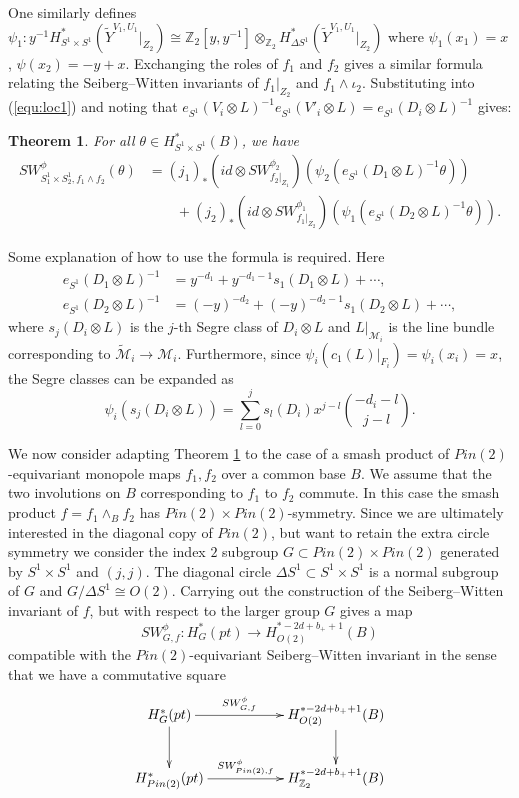 \documentclass{amsart}
\newtheorem{theorem}{Theorem}[section]
\theoremstyle{definition}
\theoremstyle{remark}
\numberwithin{equation}{section}
\begin{document}
One similarly defines $\psi_1 : y^{-1} H^*_{S^1 \times S^1}( \widetilde{Y}^{V_1,U_1}|_{Z_2}) \cong \mathbb{Z}_2[y,y^{-1}] \otimes_{\mathbb{Z}_2} H^*_{\Delta S^1}(\widetilde{Y}^{V_1,U_1}|_{Z_2})$ where $\psi_1(x_1) = x$, $\psi(x_2) = -y+x$. Exchanging the roles of $f_1$ and $f_2$ gives a similar formula relating the Seiberg--Witten invariants of $f_1|_{Z_2}$ and $f_1 \wedge \iota_2$. Substituting into (\ref{equ:loc1}) and noting that $e_{S^1}(V_i \otimes L)^{-1} e_{S^1}(V'_i \otimes L) = e_{S^1}(D_i \otimes L)^{-1}$ gives:
\begin{theorem}\label{thm:product1}
For all $\theta \in H^*_{S^1 \times S^1}(B)$, we have
\begin{align*}
SW^{\phi}_{S^1_1 \times S^1_2 , f_1 \wedge f_2}(\theta) &= (j_1)_*\left( id \otimes SW^{\phi_2}_{f_2|_{Z_1}}\right)( \psi_2(e_{S^1}(D_1 \otimes L)^{-1} \theta) ) \\
& \quad \quad + (j_2)_* \left(id \otimes SW^{\phi_1}_{f_1|_{Z_2}}\right)( \psi_1( e_{S^1}(D_2 \otimes L)^{-1} \theta) ).
\end{align*}
\end{theorem}
Some explanation of how to use the formula is required. Here 
\begin{align*}
e_{S^1}(D_1 \otimes L)^{-1} &= y^{-d_1} + y^{-d_1-1}s_1(D_1 \otimes L) + \cdots, \\
e_{S^1}(D_2 \otimes L)^{-1} &= (-y)^{-d_2} + (-y)^{-d_2-1}s_1(D_2 \otimes L) + \cdots,
\end{align*}
where $s_j( D_i \otimes L)$ is the $j$-th Segre class of $D_i \otimes L$ and $L|_{\mathcal{M}_i}$ is the line bundle corresponding to $\widetilde{\mathcal{M}}_i \to \mathcal{M}_i$. Furthermore, since $\psi_i( c_1(L)|_{F_i} ) = \psi_i(x_i) = x$, the Segre classes can be expanded as
\[
\psi_i ( s_j( D_i \otimes L) ) = \sum_{l = 0}^{j} s_l(D_i) x^{j-l} \binom{-d_i-l}{j-l}.
\]

We now consider adapting Theorem \ref{thm:product1} to the case of a smash product of $Pin(2)$-equivariant monopole maps $f_1, f_2$ over a common base $B$. We assume that the two involutions on $B$ corresponding to $f_1$ to $f_2$ commute. In this case the smash product $f = f_1 \wedge_B f_2$ has $Pin(2) \times Pin(2)$-symmetry. Since we are ultimately interested in the diagonal copy of $Pin(2)$, but want to retain the extra circle symmetry we consider the index $2$ subgroup $G \subset Pin(2) \times Pin(2)$ generated by $S^1 \times S^1$ and $(j,j)$. The diagonal circle $\Delta S^1 \subset S^1 \times S^1$ is a normal subgroup of $G$ and $G/\Delta S^1 \cong O(2)$. Carrying out the construction of the Seiberg--Witten invariant of $f$, but with respect to the larger group $G$ gives a map
\[
SW_{G,f}^{\phi} : H^*_{G}(pt) \to H_{O(2)}^{*-2d+b_++1}(B)
\]
compatible with the $Pin(2)$-equivariant Seiberg--Witten invariant in the sense that we have a commutative square
\[
\xymatrix{
H_{G}^*(pt) \ar[rr]^-{SW_{G, f}^\phi} \ar[d] & & H_{O(2)}^{*-2d+b_++1}(B) \ar[d] \\
H_{Pin(2)}^*(pt) \ar[rr]^-{SW_{Pin(2),f}^\phi} & & H_{\mathbb{Z}_2}^{*-2d+b_++1}(B)
}
\]
\end{document}
